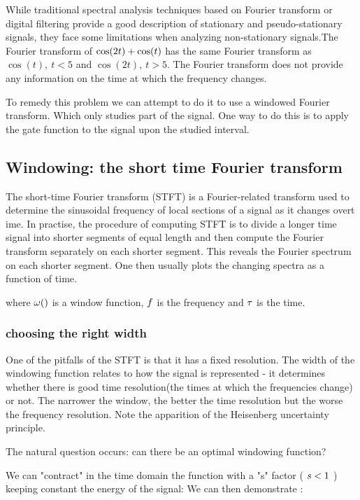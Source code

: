 \documentclass[11pt, openright]{book}
\begin{document}
While traditional spectral analysis techniques based on Fourier transform or digital filtering provide a good description of stationary and pseudo-stationary signals, they face some limitations when analyzing non-stationary signals.The Fourier transform of $\displaystyle{\cos(2t)+\cos(t)}$ has the same Fourier transform as $\cos(t),\ t<5$ and $\cos(2t),\ t>5$. The Fourier transform does not provide any information on the time at which the frequency changes.

To remedy this problem we can attempt to do it to use a windowed Fourier transform. Which only studies part of the signal. One way to do this is to apply the gate function to the signal upon the studied interval.

\subsection{Windowing: the short time Fourier transform}

The short-time Fourier transform (STFT) is a Fourier-related transform used to determine the sinusoidal frequency of local sections of a signal as it changes overt ime. In practise, the procedure of computing STFT is to divide a longer time signal into shorter segments of equal length and then compute the Fourier transform separately on each shorter segment. This reveals the Fourier spectrum on each shorter segment. One then usually plots the changing spectra as a function of time. %

where $\displaystyle{\omega()}$ is a window function, $\displaystyle{f}$ is the frequency and $\displaystyle{\tau}$ is the time.

\subsubsection{choosing the right width}

One of the pitfalls of the STFT is that it has a fixed resolution. The width of the windowing function relates to how the signal is represented - it determines whether there is good time resolution(the times at which the frequencies change) or not. The narrower the window, the better the time resolution but the worse the frequency resolution. Note the apparition of the Heisenberg uncertainty principle.


The natural question occurs: can there be an optimal windowing function?

We can "contract" in the time domain the function with a "s" factor ( $\displaystyle{s<1}$ ) keeping constant the energy of the signal:
We can then demonstrate :
\end{document}
